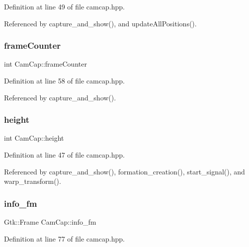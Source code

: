 Definition at line 49 of file camcap.\+hpp.



Referenced by capture\+\_\+and\+\_\+show(), and update\+All\+Positions().

\mbox{\label{class_cam_cap_a8a9611d808c20c937eb8a543bdf00cee}} 
\subsubsection{\texorpdfstring{frame\+Counter}{frameCounter}}
{\footnotesize\ttfamily int Cam\+Cap\+::frame\+Counter}



Definition at line 58 of file camcap.\+hpp.



Referenced by capture\+\_\+and\+\_\+show().

\mbox{\label{class_cam_cap_ab2c69bebfede0ba522b982b5f47b384e}} 
\subsubsection{\texorpdfstring{height}{height}}
{\footnotesize\ttfamily int Cam\+Cap\+::height}



Definition at line 47 of file camcap.\+hpp.



Referenced by capture\+\_\+and\+\_\+show(), formation\+\_\+creation(), start\+\_\+signal(), and warp\+\_\+transform().

\mbox{\label{class_cam_cap_a411c71ae763f50f8a8752bb9a6ddc4d1}} 
\subsubsection{\texorpdfstring{info\+\_\+fm}{info\_fm}}
{\footnotesize\ttfamily Gtk\+::\+Frame Cam\+Cap\+::info\+\_\+fm}



Definition at line 77 of file camcap.\+hpp.



